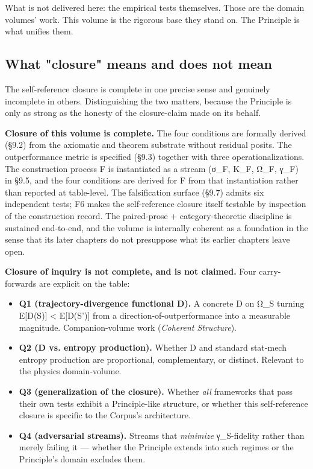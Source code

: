 \documentclass[11pt, openany]{book}
\begin{document}
What is not delivered here: the empirical tests themselves. Those are the domain volumes' work. This volume is the rigorous base they stand on. The Principle is what unifies them.

\subsection{What "closure" means and does not mean}

The self-reference closure is complete in one precise sense and genuinely incomplete in others. Distinguishing the two matters, because the Principle is only as strong as the honesty of the closure-claim made on its behalf.

\textbf{Closure of this volume is complete.} The four conditions are formally derived (§9.2) from the axiomatic and theorem substrate without residual posits. The outperformance metric is specified (§9.3) together with three operationalizations. The construction process F is instantiated as a stream (σ\_\allowbreak{}F, K\_\allowbreak{}F, Ω\_\allowbreak{}F, γ\_\allowbreak{}F) in §9.5, and the four conditions are derived for F from that instantiation rather than reported at table-level. The falsification surface (§9.7) admits six independent tests; F6 makes the self-reference closure itself testable by inspection of the construction record. The paired-prose + category-theoretic discipline is sustained end-to-end, and the volume is internally coherent as a foundation in the sense that its later chapters do not presuppose what its earlier chapters leave open.

\textbf{Closure of inquiry is not complete, and is not claimed.} Four carry-forwards are explicit on the table:

\begin{itemize}
\item \textbf{Q1 (trajectory-divergence functional D).} A concrete D on Ω\_\allowbreak{}S turning E[D(S)] < E[D(S')] from a direction-of-outperformance into a measurable magnitude. Companion-volume work (\textit{Coherent Structure}).
\item \textbf{Q2 (D vs. entropy production).} Whether D and standard stat-mech entropy production are proportional, complementary, or distinct. Relevant to the physics domain-volume.
\item \textbf{Q3 (generalization of the closure).} Whether \textit{all} frameworks that pass their own tests exhibit a Principle-like structure, or whether this self-reference closure is specific to the Corpus's architecture.
\item \textbf{Q4 (adversarial streams).} Streams that \textit{minimize} γ\_\allowbreak{}S-fidelity rather than merely failing it --- whether the Principle extends into such regimes or the Principle's domain excludes them.
\end{itemize}
\end{document}
